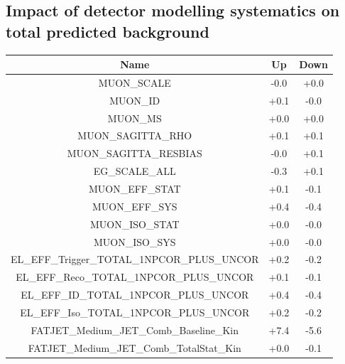 \subsection{Impact of detector modelling systematics on total predicted background}
\label{app:boosted_syst_det}

\begin{table}[htbp!]
\begin{center}
\begin{tabular}{c|c|c}
Name                                                         &      Up  &     Down  \\
\hline
MUON\_SCALE                                                  &     -0.0 &     +0.0  \\
MUON\_ID                                                     &     +0.1 &     -0.0  \\
MUON\_MS                                                     &     +0.0 &     +0.0  \\
MUON\_SAGITTA\_RHO                                           &     +0.1 &     +0.1  \\
MUON\_SAGITTA\_RESBIAS                                       &     -0.0 &     +0.1  \\
EG\_SCALE\_ALL                                               &     -0.3 &     +0.1  \\
MUON\_EFF\_STAT                                              &     +0.1 &     -0.1  \\
MUON\_EFF\_SYS                                               &     +0.4 &     -0.4  \\
MUON\_ISO\_STAT                                              &     +0.0 &     -0.0  \\
MUON\_ISO\_SYS                                               &     +0.0 &     -0.0  \\
EL\_EFF\_Trigger\_TOTAL\_1NPCOR\_PLUS\_UNCOR                 &     +0.2 &     -0.2  \\
EL\_EFF\_Reco\_TOTAL\_1NPCOR\_PLUS\_UNCOR                    &     +0.1 &     -0.1  \\
EL\_EFF\_ID\_TOTAL\_1NPCOR\_PLUS\_UNCOR                      &     +0.4 &     -0.4  \\
EL\_EFF\_Iso\_TOTAL\_1NPCOR\_PLUS\_UNCOR                     &     +0.2 &     -0.2  \\
FATJET\_Medium\_JET\_Comb\_Baseline\_Kin                     &     +7.4 &     -5.6  \\
FATJET\_Medium\_JET\_Comb\_TotalStat\_Kin                    &     +0.0 &     -0.1  \\

\end{tabular}
\end{center}
\end{table}
